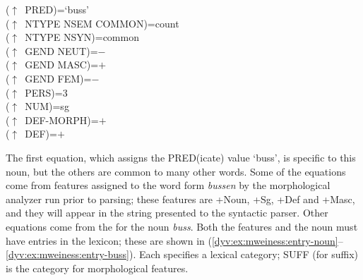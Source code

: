 \documentclass[output=paper]{langsci/langscibook}
\begin{document}


\ea\label{dyv:ex:mweiness:f-descr-bussen}
{\small 
($\uparrow$~PRED)=`buss' \\
($\uparrow$~NTYPE NSEM COMMON)=count \\
($\uparrow$~NTYPE NSYN)=common \\
($\uparrow$~GEND NEUT)=$-$ \\
($\uparrow$~GEND MASC)=$+$ \\
($\uparrow$~GEND FEM)=$-$ \\
($\uparrow$~PERS)=3 \\
($\uparrow$~NUM)=sg \\
($\uparrow$~DEF-MORPH)=$+$ \\
($\uparrow$~DEF)=$+$ \\
}
\z

The first equation, which assigns the PRED(icate) value `buss', is specific to this noun, but the others are common to many other words.
Some of the equations come from features assigned to the word form \textit{bussen} by the morphological analyzer run prior to parsing; these features are +Noun, +Sg, +Def and +Masc, and they will appear in the string presented to the syntactic parser.
Other equations come from the  for the noun  \textit{buss}.
Both the features and the noun must have entries in the lexicon;  these are shown in (\ref{dyv:ex:mweiness:entry-noun}--\ref{dyv:ex:mweiness:entry-buss}).
Each  specifies a lexical category; SUFF (for suffix) is the category for morphological features.
\end{document}
